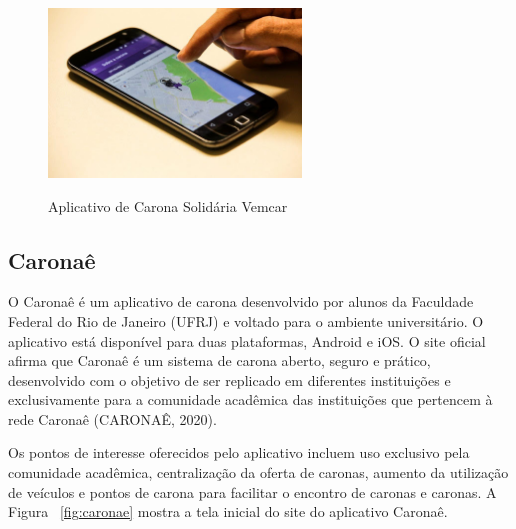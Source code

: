 
\begin{figure}[!hbtp]
	\centering
	\caption{Aplicativo de Carona Solidária Vemcar}
	\includegraphics[width=0.6\textwidth]{./04-figuras/vemcar.jpg}
	\label{fig:tecnologia}
\end{figure}


\subsection{Caronaê}


O Caronaê é um aplicativo de carona desenvolvido por alunos da Faculdade Federal do Rio de Janeiro (UFRJ) e voltado para o ambiente universitário. O aplicativo está disponível para duas plataformas, Android e iOS. O site oficial afirma que Caronaê é um sistema de carona aberto, seguro e prático, desenvolvido com o objetivo de ser replicado em diferentes instituições e exclusivamente para a comunidade acadêmica das instituições que pertencem à rede Caronaê (CARONAÊ, 2020).

Os pontos de interesse oferecidos pelo aplicativo incluem uso exclusivo pela comunidade acadêmica, centralização da oferta de caronas, aumento da utilização de veículos e pontos de carona para facilitar o encontro de caronas e caronas. A Figura ~\ref{fig:caronae} mostra a tela inicial do site do aplicativo Caronaê.

